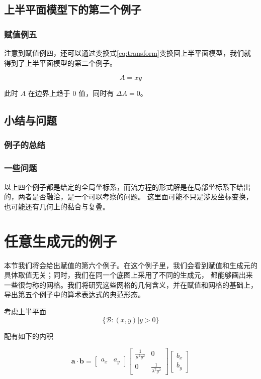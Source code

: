 \documentclass[a4paper,12pt]{article}
\numberwithin{definition}{section}
\numberwithin{lemma}{section}
\numberwithin{proposition}{section}
\numberwithin{theorem}{section}
\numberwithin{grammar}{section}
\numberwithin{program}{section}
\numberwithin{convention}{section}
\numberwithin{corollary}{section}
\begin{document}
\subsection{上半平面模型下的第二个例子}

\subsubsection{赋值例五}\label{subsec:exmp5}

注意到赋值例四，还可以通过变换式\ref{eq:transform}变换回上半平面模型，我们就得到了上半平面模型的第二个例子。

\begin{equation}
A = xy
\end{equation}

此时 $A$ 在边界上趋于 $0$ 值，同时有 $\Delta A = 0$。

\subsection{小结与问题}

\subsubsection{例子的总结}

\subsubsection{一些问题}

以上四个例子都是给定的全局坐标系，而流方程的形式解是在局部坐标系下给出的，两者是否融洽，是一个可以考察的问题。
这里面可能不只是涉及坐标变换，也可能还有几何上的黏合与复叠。

\newpage

\section{任意生成元的例子}

本节我们将会给出赋值的第六个例子。在这个例子里，我们会看到赋值和生成元的具体取值无关；同时，我们在同一个底图上采用了不同的生成元，
都能够画出来一些很匀称的网格。我们将研究这些网格的几何含义，并在赋值和网格的基础上，导出第五个例子中的算术表达式的典范形态。

考虑上半平面
\[
\{\mathcal{B}: (x, y) | y > 0 \}
\]

配有如下的内积

\[
\mathbf{a} \cdot \mathbf{b} = \begin{bmatrix} a_x & a_y \end{bmatrix} \begin{bmatrix} \frac{1}{\mu^2 y^2} & 0 \\ 0 & \frac{1}{\lambda^2 y^2} \end{bmatrix} \begin{bmatrix} b_x \\ b_y \end{bmatrix}
\]
\end{document}
